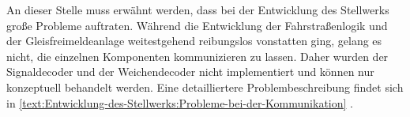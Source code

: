 An dieser Stelle muss erwähnt werden, dass bei der Entwicklung des Stellwerks große Probleme auftraten. Während die Entwicklung der Fahrstraßenlogik und der Gleisfreimeldeanlage weitestgehend reibungslos vonstatten ging, gelang es nicht, die einzelnen Komponenten kommunizieren zu lassen. Daher wurden der Signaldecoder und der Weichendecoder nicht implementiert und können nur konzeptuell behandelt werden. Eine detailliertere Problembeschreibung findet sich in \autoref{text:Entwicklung-des-Stellwerks:Probleme-bei-der-Kommunikation} .

\newpage


\newpage


\newpage


\newpage


\newpage


\newpage

